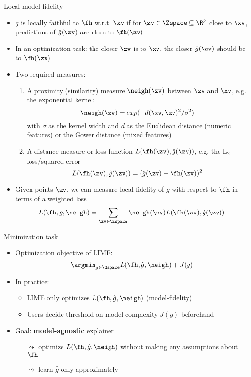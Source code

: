 \documentclass[11pt,compress,t,notes=noshow, aspectratio=169, xcolor=table]{beamer}
\newcommand{\gh}{\hat{g}}
\begin{document}
\begin{frame}{Local model fidelity}
 	\begin{itemize}
 		\item $g$ is locally faithful to $\fh$ w.r.t. $\xv$ 
 		if for $\zv \in \Zspace \subseteq \R^p$ close to $\xv$, predictions of $\gh(\zv)$ are close to $\fh(\zv)$ 
 		\item In an optimization task: the closer $\zv$ is to $\xv$, the closer $\gh(\zv)$ should be to $\fh(\zv)$  
 		\pause
 		\item Two required measures:
 		\begin{enumerate}
 			\item A proximity (similarity) measure $\neigh(\zv)$ between $\zv$ and $\xv$, e.g. the exponential kernel:
 			$$\neigh(\zv) = exp(-d(\xv, \zv)^2/\sigma^2)$$ 
 			with $\sigma$ as the kernel width and $d$ as the Euclidean distance (numeric features) or the Gower distance (mixed features) 
 			\pause
 			\item A distance measure or loss function $L(\fh(\zv), \gh(\zv))$, e.g. the L$_2$ loss/squared error
 			$$L(\fh(\zv), \gh(\zv)) = (\gh(\zv) - \fh(\zv))^2$$ 
 		\end{enumerate}
 		\pause
 		\item Given points $\zv$, we can measure local fidelity of $g$ with respect to $\fh$ in terms of a weighted loss
 		$$ L(\fh, g, \neigh) = \sum_{\zv \in \Zspace} \neigh(\zv) L(\fh(\zv), \gh(\zv)) $$
 	\end{itemize}
\end{frame}

\begin{frame}[c]{Minimization task}
	\begin{itemize}
		\item Optimization objective of LIME: 
		$$ \argmin_{g \in \Gspace} L(\fh, \gh, \neigh) + J(g)$$
		\item In practice:
		\begin{itemize}
		    \item LIME only optimizes $L(\fh, \gh, \neigh)$ (model-fidelity) 	
		    \item Users decide threshold on model complexity $J(g)$ beforehand
		\end{itemize}
		\item Goal: \textbf{model-agnostic} explainer
		\begin{itemize}
    		\item[$\leadsto$] optimize $L(\fh, \gh, \neigh)$ without making any assumptions about $\fh$ 
    		\item[$\leadsto$] learn $\gh$ only approximately  
		\end{itemize}
		\end{itemize}
\end{frame} 
\end{document}
